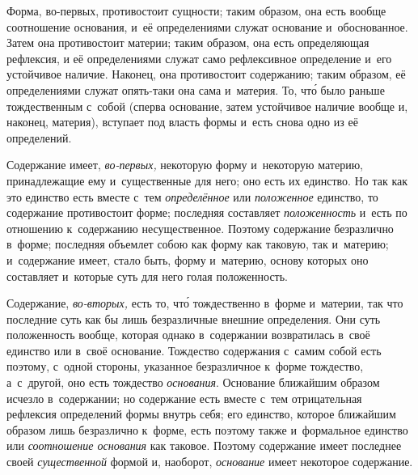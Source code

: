 
Форма, во-первых, противостоит сущности; таким образом, она есть вообще
соотношение основания, и~её определениями служат основание и~обоснованное.
Затем она противостоит материи; таким образом, она есть определяющая рефлексия,
и её определениями служат само рефлексивное определение и~его устойчивое
наличие. Наконец, она противостоит содержанию; таким образом, её определениями
служат опять-таки она сама и~материя. То, чт\'{о} было раньше тождественным
с~собой (сперва основание, затем устойчивое наличие вообще и, наконец,
материя), вступает под власть формы и~есть снова одно из её определений.

Содержание имеет, {\em во-первых,} некоторую форму и~некоторую материю,
принадлежащие ему и~существенные для него; оно есть их единство. Но так как это
единство есть вместе с~тем {\em определённое} или {\em положенное} единство, то
содержание противостоит форме; последняя составляет {\em положенность} и~есть
по отношению к~содержанию несущественное. Поэтому содержание безразлично
в~форме; последняя объемлет собою как форму как таковую, так и~материю;
и~содержание имеет, стало быть, форму и~материю, основу которых оно составляет
и~которые суть для него голая положенность.

Содержание, {\em во-вторых,} есть то, чт\'{о} тождественно в~форме и~материи,
так что последние суть как бы лишь безразличные внешние определения. Они суть
положенность вообще, которая однако в~содержании возвратилась в~своё единство
или в~своё основание. Тождество содержания с~самим собой есть поэтому, с~одной
стороны, указанное безразличное к~форме тождество, а~с~другой, оно есть
тождество {\em основания}. Основание ближайшим образом исчезло в~содержании; но
содержание есть вместе с~тем отрицательная рефлексия определений формы внутрь
себя; его единство, которое ближайшим образом лишь безразлично к~форме, есть
поэтому также и~формальное единство или {\em соотношение основания} как
таковое. Поэтому содержание имеет последнее своей {\em существенной} формой и,
наоборот, {\em основание} имеет некоторое содержание.

